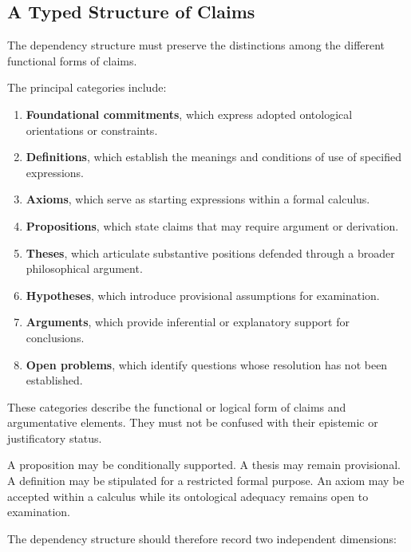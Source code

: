 \subsection{A Typed Structure of Claims}

The dependency structure must preserve the distinctions among
the different functional forms of claims.

The principal categories include:

\begin{enumerate}
    \item \textbf{Foundational commitments}, which express
    adopted ontological orientations or constraints.

    \item \textbf{Definitions}, which establish the meanings
    and conditions of use of specified expressions.

    \item \textbf{Axioms}, which serve as starting expressions
    within a formal calculus.

    \item \textbf{Propositions}, which state claims that may
    require argument or derivation.

    \item \textbf{Theses}, which articulate substantive positions
    defended through a broader philosophical argument.

    \item \textbf{Hypotheses}, which introduce provisional
    assumptions for examination.

    \item \textbf{Arguments}, which provide inferential or
    explanatory support for conclusions.

    \item \textbf{Open problems}, which identify questions
    whose resolution has not been established.
\end{enumerate}

These categories describe the functional or logical form of
claims and argumentative elements. They must not be confused
with their epistemic or justificatory status.

A proposition may be conditionally supported. A thesis may
remain provisional. A definition may be stipulated for a
restricted formal purpose. An axiom may be accepted within a
calculus while its ontological adequacy remains open to
examination.

The dependency structure should therefore record two independent
dimensions:

